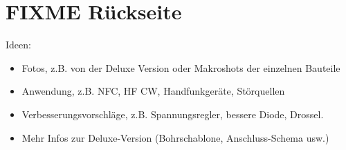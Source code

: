 \documentclass[a4paper,11pt,halfparskip,smallheadings,DIV=10]{scrartcl}
\begin{document}
\newpage

\section{FIXME Rückseite}

Ideen:

\begin{itemize}
    \item Fotos, z.B. von der Deluxe Version oder Makroshots der einzelnen Bauteile
    \item Anwendung, z.B. NFC, HF CW, Handfunkgeräte, Störquellen
    \item Verbesserungsvorschläge, z.B. Spannungsregler, bessere Diode, Drossel.
    \item Mehr Infos zur Deluxe-Version (Bohrschablone, Anschluss-Schema usw.)
\end{itemize}
\end{document}
